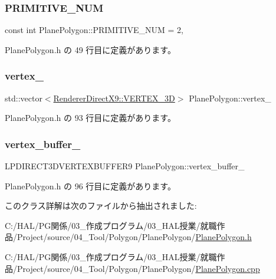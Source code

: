 \subsubsection{\texorpdfstring{P\+R\+I\+M\+I\+T\+I\+V\+E\+\_\+\+N\+UM}{PRIMITIVE\_NUM}}
{\footnotesize\ttfamily const int Plane\+Polygon\+::\+P\+R\+I\+M\+I\+T\+I\+V\+E\+\_\+\+N\+UM = 2\hspace{0.3cm}{\ttfamily [static]}, {\ttfamily [private]}}



 Plane\+Polygon.\+h の 49 行目に定義があります。

\mbox{\label{class_plane_polygon_a81a3f3d50f00a8772bc47c1015789e7a}} 
\subsubsection{\texorpdfstring{vertex\+\_\+}{vertex\_}}
{\footnotesize\ttfamily std\+::vector$<$\mbox{\hyperlink{class_renderer_direct_x9_1_1_v_e_r_t_e_x__3_d}{Renderer\+Direct\+X9\+::\+V\+E\+R\+T\+E\+X\+\_\+3D}}$>$ Plane\+Polygon\+::vertex\+\_\+\hspace{0.3cm}{\ttfamily [private]}}



 Plane\+Polygon.\+h の 93 行目に定義があります。

\mbox{\label{class_plane_polygon_a04d132486ffae704f7200718ae395170}} 
\subsubsection{\texorpdfstring{vertex\+\_\+buffer\+\_\+}{vertex\_buffer\_}}
{\footnotesize\ttfamily L\+P\+D\+I\+R\+E\+C\+T3\+D\+V\+E\+R\+T\+E\+X\+B\+U\+F\+F\+E\+R9 Plane\+Polygon\+::vertex\+\_\+buffer\+\_\+\hspace{0.3cm}{\ttfamily [private]}}



 Plane\+Polygon.\+h の 96 行目に定義があります。



このクラス詳解は次のファイルから抽出されました\+:\begin{DoxyCompactItemize}
\item 
C\+:/\+H\+A\+L/\+P\+G関係/03\+\_\+作成プログラム/03\+\_\+\+H\+A\+L授業/就職作品/\+Project/source/04\+\_\+\+Tool/\+Polygon/\+Plane\+Polygon/\mbox{\hyperlink{_plane_polygon_8h}{Plane\+Polygon.\+h}}\item 
C\+:/\+H\+A\+L/\+P\+G関係/03\+\_\+作成プログラム/03\+\_\+\+H\+A\+L授業/就職作品/\+Project/source/04\+\_\+\+Tool/\+Polygon/\+Plane\+Polygon/\mbox{\hyperlink{_plane_polygon_8cpp}{Plane\+Polygon.\+cpp}}\end{DoxyCompactItemize}
